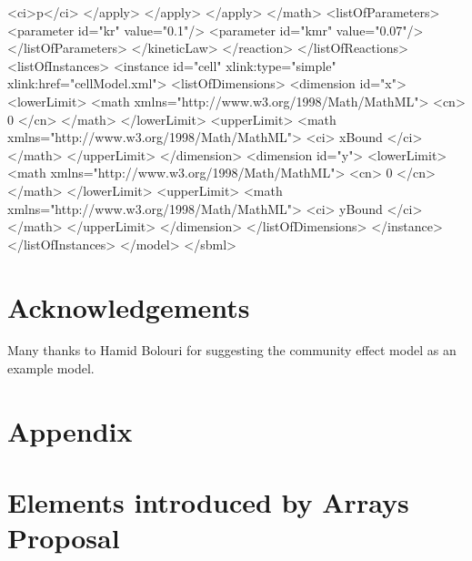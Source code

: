 \documentclass{cekarticle}
\begin{document}
\begin{example}
                                <ci>p</ci>
                            </apply>
                        </apply>    
                    </apply>
                </math>   
                <listOfParameters>
                    <parameter id="kr" value="0.1"/>
                    <parameter id="kmr" value="0.07"/>
                </listOfParameters>
            </kineticLaw>
        </reaction>
    </listOfReactions>
    <listOfInstances>
        <instance id="cell" xlink:type="simple" xlink:href="cellModel.xml">
            <listOfDimensions>
                <dimension id="x">
                    <lowerLimit>
                        <math xmlns="http://www.w3.org/1998/Math/MathML">
                            <cn> 0 </cn>
                        </math>
                    </lowerLimit>
                    <upperLimit>
                        <math xmlns="http://www.w3.org/1998/Math/MathML">
                            <ci> xBound </ci>
                        </math>
                    </upperLimit>
                </dimension>
                <dimension id="y">
                    <lowerLimit>
                        <math xmlns="http://www.w3.org/1998/Math/MathML">
                            <cn> 0 </cn>
                        </math>
                    </lowerLimit>
                    <upperLimit>
                        <math xmlns="http://www.w3.org/1998/Math/MathML">
                            <ci> yBound </ci>
                        </math>
                    </upperLimit>
                </dimension>
            </listOfDimensions>
        </instance>
    </listOfInstances>
</model>
</sbml>
\end{example}

\section{Acknowledgements}

Many thanks to Hamid Bolouri for suggesting the community effect model as an example model.

\newpage
\section{Appendix}
\setcounter{secnumdepth}{2}
\appendix


\section{Elements introduced by Arrays Proposal}
\label{apdx:newelements}
\end{document}
